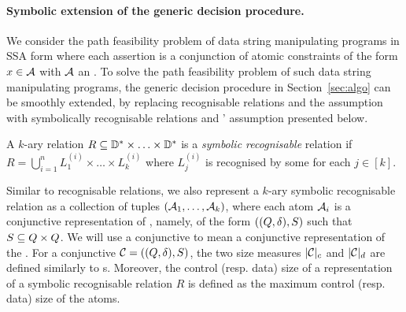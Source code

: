 

\paragraph{Symbolic extension of the generic decision procedure.} We consider the path feasibility problem of data string manipulating programs in SSA form where each assertion is a conjunction of atomic constraints of the form $x \in \mathcal{A}$ with $\mathcal{A}$ an \SA. 
To solve the path feasibility problem of such data string manipulating programs,
the generic decision procedure in Section~\ref{sec:algo} can be smoothly extended, by replacing recognisable relations and the \prerec{} assumption with symbolically recognisable relations  and \prerec{}' assumption presented below.

\begin{definition}[Symbolic recognisable relations]
	A $k$-ary relation $R \subseteq \mathbb{D}^*\times \ldots\times \mathbb{D}^*$ is a \emph{symbolic recognisable} relation if $R=\bigcup_{i=1}^n L^{(i)}_1 \times \ldots \times L^{(i)}_k$ where $L^{(i)}_j$ is recognised by some \SA{} for each $j\in [k]$.
\end{definition}
Similar to recognisable relations, we also represent a  $k$-ary symbolic recognisable relation as a collection of tuples $(\mathcal{A}_1, \ldots, \mathcal{A}_k)$, where each atom $\mathcal{A}_i$ is a conjunctive representation of \SA{}, namely, of the form $((Q, \delta), S)$ such that $S \subseteq Q \times Q$. We will use a conjunctive \SA{} to mean a conjunctive representation of the \SA{}. For a conjunctive \SA{} $\mathcal{C}= ((Q, \delta), S)$, the two size measures $|\mathcal{C}|_c$ and $|\mathcal{C}|_d$ are defined similarly to \SA{}s. Moreover, the control (resp. data) size of a representation of a symbolic recognisable relation $R$  is defined as the maximum control (resp. data) size of the atoms.

